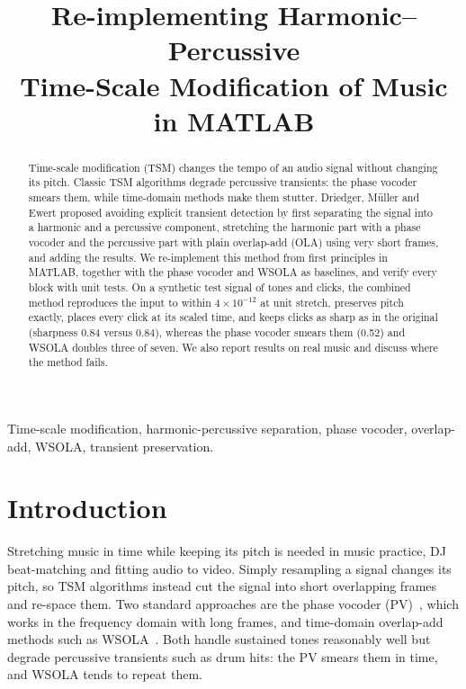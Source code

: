 \documentclass[conference]{IEEEtran}
\newcommand{\fillin}[1]{\textcolor{red}{[#1]}}
\begin{document}
\title{Re-implementing Harmonic--Percussive\\Time-Scale Modification of Music in MATLAB}

\author{
\IEEEauthorblockN{Anshika \fillin{Surname}, Mridhula \fillin{Surname}, Anya Maheshwari}
}

\maketitle

\begin{abstract}
Time-scale modification (TSM) changes the tempo of an audio signal without changing its pitch. Classic TSM algorithms degrade percussive transients: the phase vocoder smears them, while time-domain methods make them stutter. Driedger, M\"uller and Ewert proposed avoiding explicit transient detection by first separating the signal into a harmonic and a percussive component, stretching the harmonic part with a phase vocoder and the percussive part with plain overlap-add (OLA) using very short frames, and adding the results. We re-implement this method from first principles in MATLAB, together with the phase vocoder and WSOLA as baselines, and verify every block with unit tests. On a synthetic test signal of tones and clicks, the combined method reproduces the input to within $4\times10^{-12}$ at unit stretch, preserves pitch exactly, places every click at its scaled time, and keeps clicks as sharp as in the original (sharpness 0.84 versus 0.84), whereas the phase vocoder smears them (0.52) and WSOLA doubles three of seven. We also report results on real music and discuss where the method fails.
\end{abstract}

\begin{IEEEkeywords}
Time-scale modification, harmonic-percussive separation, phase vocoder, overlap-add, WSOLA, transient preservation.
\end{IEEEkeywords}

\section{Introduction}

Stretching music in time while keeping its pitch is needed in music practice, DJ beat-matching and fitting audio to video. Simply resampling a signal changes its pitch, so TSM algorithms instead cut the signal into short overlapping frames and re-space them. Two standard approaches are the phase vocoder (PV)~\cite{flanagan66}, which works in the frequency domain with long frames, and time-domain overlap-add methods such as WSOLA~\cite{verhelst93}. Both handle sustained tones reasonably well but degrade percussive transients such as drum hits: the PV smears them in time, and WSOLA tends to repeat them.
\end{document}
